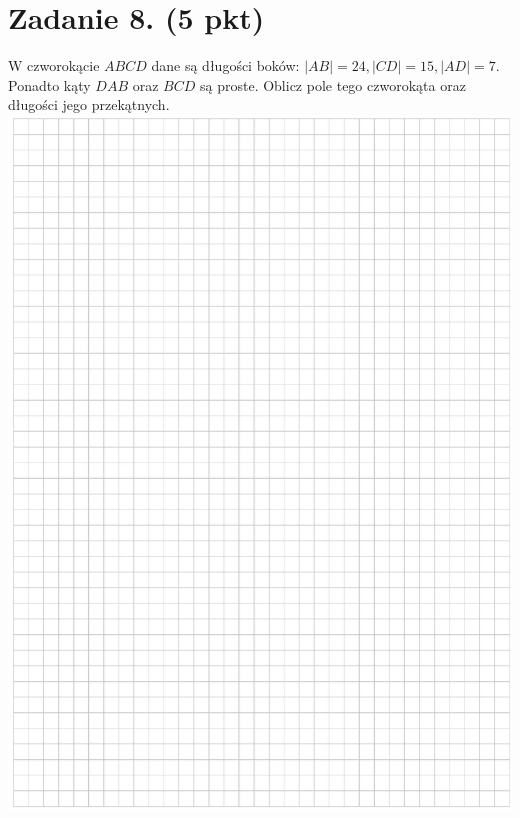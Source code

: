 \documentclass[10pt]{article}
\begin{document}
\section*{Zadanie 8. (5 pkt)}
W czworokącie \(A B C D\) dane są długości boków: \(|A B|=24,|C D|=15,|A D|=7\). Ponadto kąty \(D A B\) oraz \(B C D\) są proste. Oblicz pole tego czworokąta oraz długości jego przekątnych.\\
\includegraphics[max width=\textwidth, center]{2024_11_21_d9af6ed2d610d3f2d2cbg-12}\\
\end{document}
